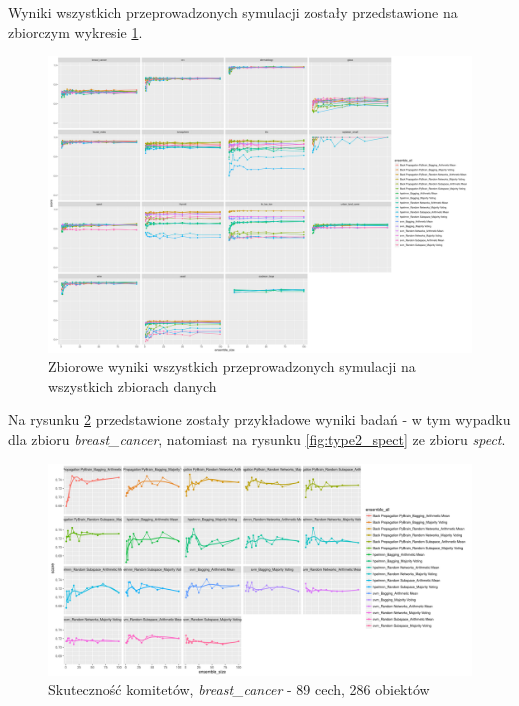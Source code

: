 \documentclass[11pt, a4paper, titlepage]{report}
\begin{document}
Wyniki wszystkich przeprowadzonych symulacji zostały przedstawione na zbiorczym wykresie \ref{fig:overall}.

\begin{figure}[h]
	\includegraphics[height=1.0\textwidth,keepaspectratio, angle=90]{overall}
    \centering
    \caption{Zbiorowe wyniki wszystkich przeprowadzonych symulacji na wszystkich zbiorach danych}
    \label{fig:overall}
\end{figure}

Na rysunku \ref{fig:type2_breast} przedstawione zostały przykładowe wyniki badań - w tym wypadku dla zbioru \textit{breast\_cancer}, natomiast na rysunku \ref{fig:type2_spect} ze zbioru \textit{spect}.

\begin{figure}[H]
	\includegraphics[width=1.0\textwidth]{type2_score_size_model_breast_cancer}
    \centering
    \caption{Skuteczność komitetów, \textit{breast\_cancer} - 89 cech, 286 obiektów}
    \label{fig:type2_breast}
\end{figure}
\end{document}
